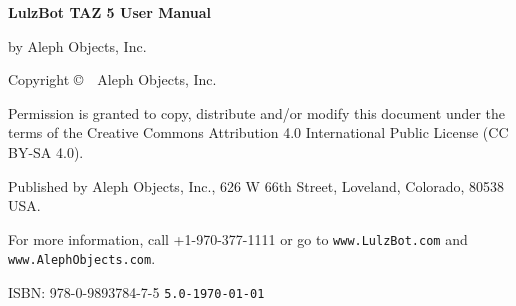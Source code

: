 %
%
%
%
%


\clearpage\null\vfill
\begingroup 
\thispagestyle{empty}
\footnotesize\raggedright
\setlength{\parskip}{0.5\baselineskip}

\textbf{LulzBot\textsuperscript{\miniscule{\textregistered}} TAZ 5 User Manual}

by Aleph Objects, Inc.

Copyright \copyright\ \the\year\ Aleph Objects, Inc.\par
Permission is granted to copy, distribute and\slash or modify 
this document under the terms of the
Creative Commons Attribution 4.0 International Public License
(CC BY-SA 4.0).

Published by Aleph Objects, Inc., 626 W 66th Street, Loveland, Colorado, 80538 USA.

For more information, call +1-970-377-1111 or go to \texttt{www.LulzBot.com} and \texttt{www.AlephObjects.com}.

ISBN: 978-0-9893784-7-5
\renewcommand{\dateseparator}{}
\hfill\texttt{5.0-\yyyymmdddate\today} %
\endgroup
\pagebreak{}
